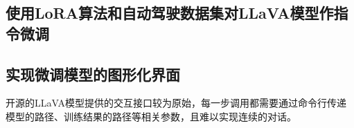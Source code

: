 \documentclass[
    linespread = 1.25
]{ctexart}
\begin{document}



\subsection{使用LoRA算法和自动驾驶数据集对LLaVA模型作指令微调}




\subsection{实现微调模型的图形化界面}
开源的LLaVA模型提供的交互接口较为原始，每一步调用都需要通过命令行传递模型的路径、训练结果的路径等相关参数，且难以实现连续的对话。
\end{document}
